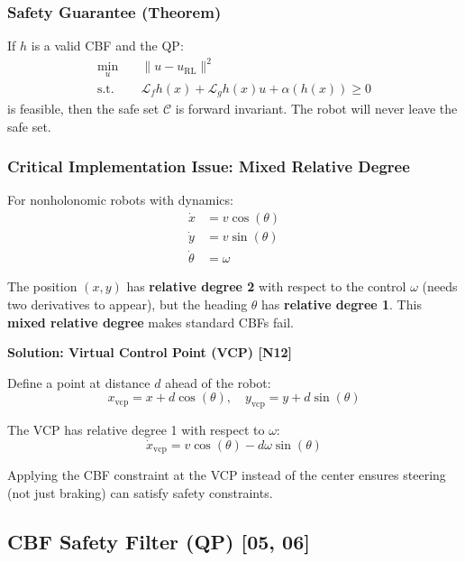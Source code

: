 \documentclass[11pt,a4paper]{report}
\begin{document}
\subsubsection{Safety Guarantee (Theorem)}
If $h$ is a valid CBF and the QP:
\begin{equation}
    \begin{aligned}
        \min_{u} \quad & \|u - u_{\text{RL}}\|^2 \\
        \text{s.t.} \quad & \mathcal{L}_f h(x) + \mathcal{L}_g h(x) u + \alpha(h(x)) \geq 0
    \end{aligned}
\end{equation}
is feasible, then the safe set $\mathcal{C}$ is forward invariant. The robot will never leave the safe set.

\subsubsection{Critical Implementation Issue: Mixed Relative Degree}

For nonholonomic robots with dynamics:
\begin{align}
    \dot{x} &= v \cos(\theta) \\
    \dot{y} &= v \sin(\theta) \\
    \dot{\theta} &= \omega
\end{align}

The position $(x,y)$ has \textbf{relative degree 2} with respect to the control $\omega$ (needs two derivatives to appear), but the heading $\theta$ has \textbf{relative degree 1}. This \textbf{mixed relative degree} makes standard CBFs fail.

\textbf{Solution: Virtual Control Point (VCP) [N12]}

Define a point at distance $d$ ahead of the robot:
\begin{equation}
    x_{\text{vcp}} = x + d \cos(\theta), \quad y_{\text{vcp}} = y + d \sin(\theta)
\end{equation}

The VCP has relative degree 1 with respect to $\omega$:
\begin{equation}
    \dot{x}_{\text{vcp}} = v \cos(\theta) - d \omega \sin(\theta)
\end{equation}

Applying the CBF constraint at the VCP instead of the center ensures steering (not just braking) can satisfy safety constraints.

\subsection{CBF Safety Filter (QP) [05, 06]}
\end{document}
